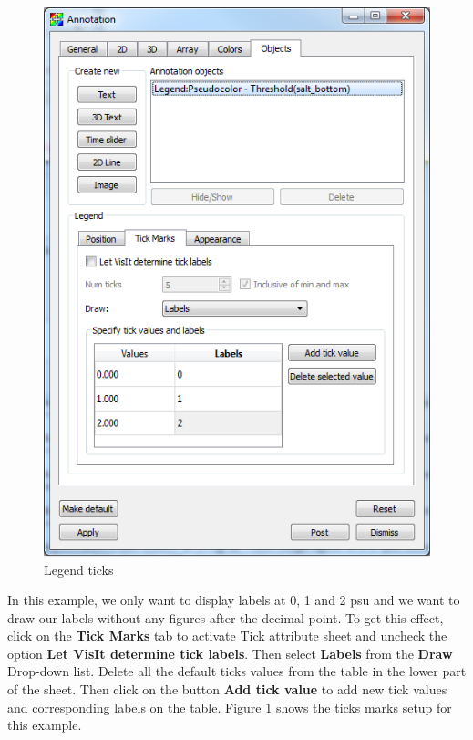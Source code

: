 \documentclass[12pt]{report}
\begin{document}
				\begin{figure}
        \begin{center}
        \includegraphics{legendAttrTicks}
        \caption{Legend ticks}
        \label{figure:legendAttrTicks}
        \end{center}
        \end{figure} 
				
In this example, we only want to display labels at 0, 1 and 2 psu and we want to draw our labels without
any figures after the decimal point. 
To get this effect, click on the {\bf Tick Marks} tab to activate Tick attribute sheet and uncheck the option 
{\bf Let VisIt determine tick labels}. Then select {\bf Labels} from the {\bf Draw} Drop-down list. 
Delete all the default ticks values from the table in the lower part of the sheet.  Then click on 
the button {\bf Add tick value} to add new tick values and corresponding labels on the table.  
Figure \ref{figure:legendAttrTicks} shows the ticks marks setup for this example.
				
\end{document}

